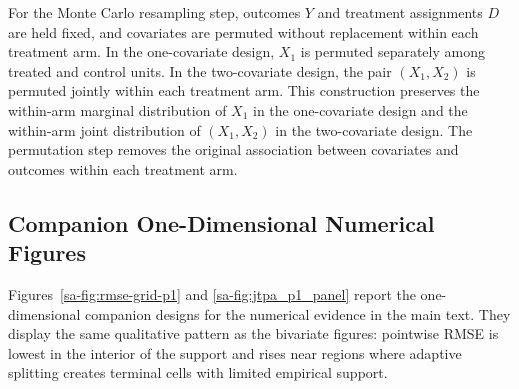 \documentclass[10pt]{article}
\theoremstyle{definition}
\theoremstyle{remark}
\begin{document}
For the Monte Carlo resampling step, outcomes $Y$ and treatment assignments $D$ are held fixed, and covariates are permuted without replacement within each treatment arm. In the one-covariate design, $X_1$ is permuted separately among treated and control units. In the two-covariate design, the pair $(X_1,X_2)$ is permuted jointly within each treatment arm. This construction preserves the within-arm marginal distribution of $X_1$ in the one-covariate design and the within-arm joint distribution of $(X_1,X_2)$ in the two-covariate design. The permutation step removes the original association between covariates and outcomes within each treatment arm.

\subsection{Companion One-Dimensional Numerical Figures}\label{sa-sec:companion-figures}

Figures~\ref{sa-fig:rmse-grid-p1} and \ref{sa-fig:jtpa_p1_panel} report the one-dimensional companion designs for the numerical evidence in the main text. They display the same qualitative pattern as the bivariate figures: pointwise RMSE is lowest in the interior of the support and rises near regions where adaptive splitting creates terminal cells with limited empirical support.
\end{document}
